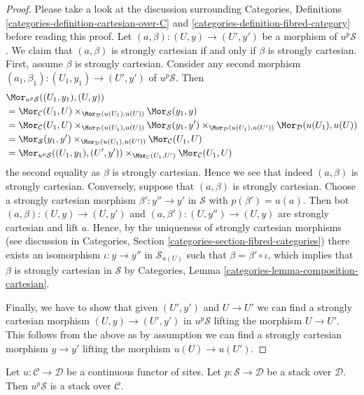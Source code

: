 \begin{proof}
Please take a look at the discussion surrounding
Categories, Definitions \ref{categories-definition-cartesian-over-C} and
\ref{categories-definition-fibred-category}
before reading this proof.
Let $(a, \beta) : (U, y) \to (U', y')$ be a morphism of $u^p\mathcal{S}$.
We claim that $(a, \beta)$ is strongly cartesian if and only if
$\beta$ is strongly cartesian. First, assume $\beta$ is strongly cartesian.
Consider any second morphism
$(a_1, \beta_1) : (U_1, y_1) \to (U', y')$ of $u^p\mathcal{S}$.
Then
\begin{align*}
& \Mor_{u^p\mathcal{S}}((U_1, y_1), (U, y)) \\
& =
\Mor_\mathcal{C}(U_1, U)
\times_{\Mor_\mathcal{D}(u(U_1), u(U))}
\Mor_\mathcal{S}(y_1, y) \\
& =
\Mor_\mathcal{C}(U_1, U)
\times_{\Mor_\mathcal{D}(u(U_1), u(U))}
\Mor_\mathcal{S}(y_1, y')
\times_{\Mor_\mathcal{D}(u(U_1), u(U'))}
\Mor_\mathcal{D}(u(U_1), u(U)) \\
& =
\Mor_\mathcal{S}(y_1, y')
\times_{\Mor_\mathcal{D}(u(U_1), u(U'))}
\Mor_\mathcal{C}(U_1, U) \\
& =
\Mor_{u^p\mathcal{S}}((U_1, y_1), (U', y'))
\times_{\Mor_\mathcal{C}(U_1, U')}
\Mor_\mathcal{C}(U_1, U)
\end{align*}
the second equality as $\beta$ is strongly cartesian. Hence we see that
indeed $(a, \beta)$ is strongly cartesian. Conversely, suppose that
$(a, \beta)$ is strongly cartesian. Choose a strongly cartesian morphism
$\beta' : y'' \to y'$ in $\mathcal{S}$ with $p(\beta') = u(a)$.
Then bot $(a, \beta) : (U, y) \to (U, y')$ and
$(a, \beta') : (U, y'') \to (U, y)$ are strongly cartesian and
lift $a$. Hence, by the uniqueness of strongly cartesian morphisms
(see discussion in
Categories, Section \ref{categories-section-fibred-categories})
there exists an isomorphism $\iota : y \to y''$ in $\mathcal{S}_{u(U)}$
such that $\beta = \beta' \circ \iota$, which implies that
$\beta$ is strongly cartesian in $\mathcal{S}$ by
Categories, Lemma \ref{categories-lemma-composition-cartesian}.

\medskip\noindent
Finally, we have to show
that given $(U', y')$ and $U \to U'$ we can find a strongly
cartesian morphism $(U, y) \to (U', y')$ in $u^p\mathcal{S}$
lifting the morphism $U \to U'$. This follows from the above as by assumption
we can find a strongly cartesian morphism $y \to y'$ lifting the
morphism $u(U) \to u(U')$.
\end{proof}

\begin{lemma}
\label{lemma-stack-pushforward}
Let $u : \mathcal{C} \to \mathcal{D}$ be a continuous functor of sites.
Let $p : \mathcal{S} \to \mathcal{D}$ be a stack over $\mathcal{D}$.
Then $u^p\mathcal{S}$ is a stack over $\mathcal{C}$.
\end{lemma}


